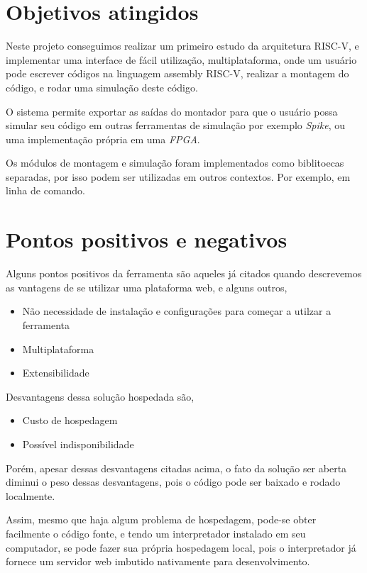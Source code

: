 \section{Objetivos atingidos}

	Neste projeto conseguimos realizar um primeiro estudo da arquitetura RISC-V, e implementar uma interface de fácil utilização, multiplataforma, onde um usuário pode escrever códigos na linguagem assembly RISC-V, realizar a montagem do código, e rodar uma simulação deste código.

	O sistema permite exportar as saídas do montador para que o usuário possa simular seu código em outras ferramentas de simulação por exemplo \textit{Spike}, ou uma implementação própria em uma \textit{FPGA}.

	Os módulos de montagem e simulação foram implementados como biblitoecas separadas, por isso podem ser utilizadas em outros contextos. Por exemplo, em linha de comando.

\section{Pontos positivos e negativos}

	Alguns pontos positivos da ferramenta são aqueles já citados quando descrevemos as vantagens de se utilizar uma plataforma web, e alguns outros,
	\begin{itemize}
		\item Não necessidade de instalação e configurações para começar a utilzar a ferramenta
		\item Multiplataforma
		\item Extensibilidade
	\end{itemize}

	Desvantagens dessa solução hospedada são,

	\begin{itemize}
		\item Custo de hospedagem
		\item Possível indisponibilidade	
	\end{itemize}

	Porém, apesar dessas desvantagens citadas acima, o fato da solução ser aberta diminui o peso dessas desvantagens, pois o código pode ser baixado e rodado localmente. 

	Assim, mesmo que haja algum problema de hospedagem, pode-se obter facilmente o código fonte, e tendo um interpretador instalado em seu computador, se pode fazer sua própria hospedagem local, pois o interpretador já fornece um servidor web imbutido nativamente para desenvolvimento.


